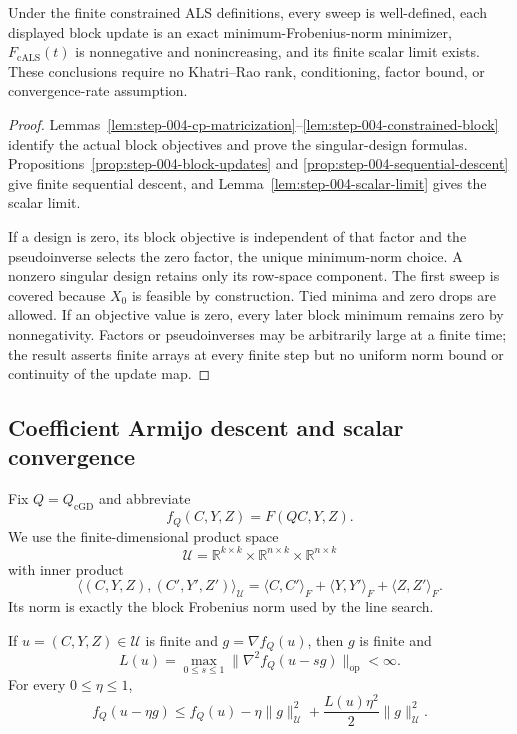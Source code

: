 \begin{proposition}\label{prop:step-004-certificate}
Under the finite constrained ALS definitions, every sweep is well-defined,
each displayed block update is an exact minimum-Frobenius-norm minimizer,
$F_{\mathrm{cALS}}(t)$ is nonnegative and nonincreasing, and its finite
scalar limit exists.  These conclusions require no Khatri--Rao rank,
conditioning, factor bound, or convergence-rate assumption.
\end{proposition}

\begin{proof}
Lemmas~\ref{lem:step-004-cp-matricization}--\ref{lem:step-004-constrained-block}
identify the actual block objectives and prove the singular-design formulas.
Propositions~\ref{prop:step-004-block-updates} and
\ref{prop:step-004-sequential-descent} give finite sequential descent, and
Lemma~\ref{lem:step-004-scalar-limit} gives the scalar limit.

If a design is zero, its block objective is independent of that factor and
the pseudoinverse selects the zero factor, the unique minimum-norm choice.  A
nonzero singular design retains only its row-space component.  The first
sweep is covered because $X_0$ is feasible by construction.  Tied minima and
zero drops are allowed.  If an objective value is zero, every later block
minimum remains zero by nonnegativity.  Factors or pseudoinverses may be
arbitrarily large at a finite time; the result asserts finite arrays at every
finite step but no uniform norm bound or continuity of the update map.
\end{proof}

\subsection{Coefficient Armijo descent and scalar convergence}\label{app:step-005}

Fix $Q=Q_{\mathrm{cGD}}$ and abbreviate
\[
 f_Q(C,Y,Z)=F(QC,Y,Z).
\]
We use the finite-dimensional product space
\[
 \mathcal U=\mathbb R^{k\times k}\times\mathbb R^{n\times k}
 \times\mathbb R^{n\times k}
\]
with inner product
\[
 \langle(C,Y,Z),(C',Y',Z')\rangle_{\mathcal U}
 =\langle C,C'\rangle_F+\langle Y,Y'\rangle_F+\langle Z,Z'\rangle_F.
\]
Its norm is exactly the block Frobenius norm used by the line search.

\begin{lemma}\label{lem:step-005-local-taylor}
If $u=(C,Y,Z)\in\mathcal U$ is finite and $g=\nabla f_Q(u)$, then $g$ is
finite and
\[
 L(u)=\max_{0\le s\le1}
 \|\nabla^2f_Q(u-sg)\|_{\mathrm{op}}<\infty.
\]
For every $0\le\eta\le1$,
\[
 f_Q(u-\eta g)
 \le f_Q(u)-\eta\|g\|_{\mathcal U}^2
 +\frac{L(u)\eta^2}{2}\|g\|_{\mathcal U}^2.
 \tag{A.1}\label{eq:step-005-taylor}
\]
\end{lemma}

